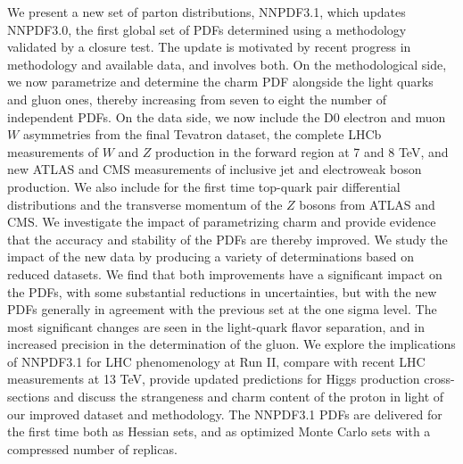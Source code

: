\documentclass[11pt]{article}
\numberwithin{equation}{section}
\numberwithin{figure}{section}
\numberwithin{table}{section}
\begin{document}
\vspace{0.2cm}
%
We present a new set of parton distributions, NNPDF3.1, which updates
NNPDF3.0, the first global set of PDFs determined using a methodology validated 
by a closure test.
The update is motivated by recent progress in methodology
and available data, and involves both. On the methodological side,
we now parametrize and determine 
the charm PDF alongside the light quarks and gluon ones,
thereby increasing from seven to eight the number of independent PDFs.
On the data side, we now include the D0 electron and muon $W$ asymmetries 
from the final Tevatron dataset, the complete
LHCb measurements of $W$ and $Z$ production in the forward
region at 7 and 8 TeV, and new ATLAS and CMS measurements of inclusive
jet and electroweak boson production. We also include
for the first time top-quark pair differential distributions
and the transverse momentum  of the $Z$ bosons from
ATLAS and CMS.
We investigate the impact of parametrizing charm and provide evidence that
the accuracy and stability of the PDFs are thereby improved. We study
the impact of the new data  by producing a variety
of determinations based on reduced datasets.
We find that both improvements have a
significant impact on the PDFs, with some substantial reductions in
uncertainties, but with the new PDFs
generally in agreement with the previous set at the one sigma level.
The most significant changes are seen in the light-quark flavor separation, 
and in increased precision in the determination of the gluon.
We explore the implications of NNPDF3.1 for LHC phenomenology at Run
II, compare with  recent
LHC measurements at 13 TeV, provide updated predictions for Higgs production
cross-sections and discuss the strangeness and charm content of the
proton in light of our improved dataset and methodology. The NNPDF3.1 PDFs
are delivered for the first time both as Hessian sets, and as
optimized Monte
Carlo sets with a compressed number  of replicas.

\clearpage

\tableofcontents

\clearpage


%

%


\clearpage


\clearpage




\appendix



\clearpage


\end{document}
